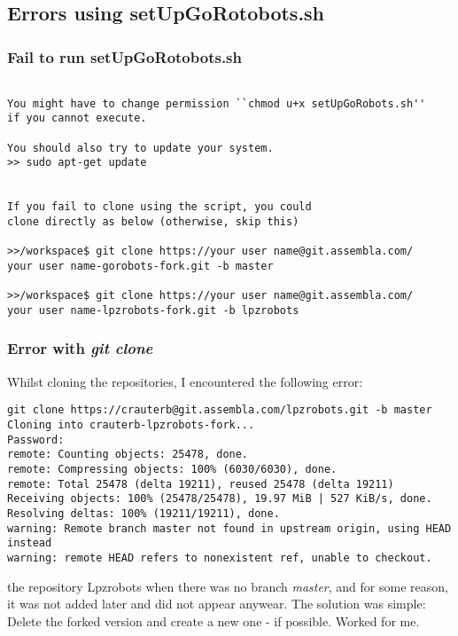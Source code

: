 \subsection{Errors using setUpGoRotobots.sh}

\subsubsection{Fail to run setUpGoRotobots.sh}
\begin{lstlisting}

You might have to change permission ``chmod u+x setUpGoRobots.sh''
if you cannot execute.

You should also try to update your system.
>> sudo apt-get update


If you fail to clone using the script, you could
clone directly as below (otherwise, skip this)

>>/workspace$ git clone https://your user name@git.assembla.com/
your user name-gorobots-fork.git -b master

>>/workspace$ git clone https://your user name@git.assembla.com/
your user name-lpzrobots-fork.git -b lpzrobots

\end{lstlisting}

\subsubsection{Error with \emph{git clone}}

Whilst cloning the repositories, I encountered the following error:
\begin{lstlisting}
git clone https://crauterb@git.assembla.com/lpzrobots.git -b master
Cloning into crauterb-lpzrobots-fork...
Password:
remote: Counting objects: 25478, done.
remote: Compressing objects: 100% (6030/6030), done.
remote: Total 25478 (delta 19211), reused 25478 (delta 19211)
Receiving objects: 100% (25478/25478), 19.97 MiB | 527 KiB/s, done.
Resolving deltas: 100% (19211/19211), done.
warning: Remote branch master not found in upstream origin, using HEAD instead
warning: remote HEAD refers to nonexistent ref, unable to checkout.
\end{lstlisting}

the repository Lpzrobots when there was no branch \emph{master}, and for some reason, it was not added later and did not appear anywear.
The solution was simple: Delete the forked version and create a new one - if possible. Worked for me.

